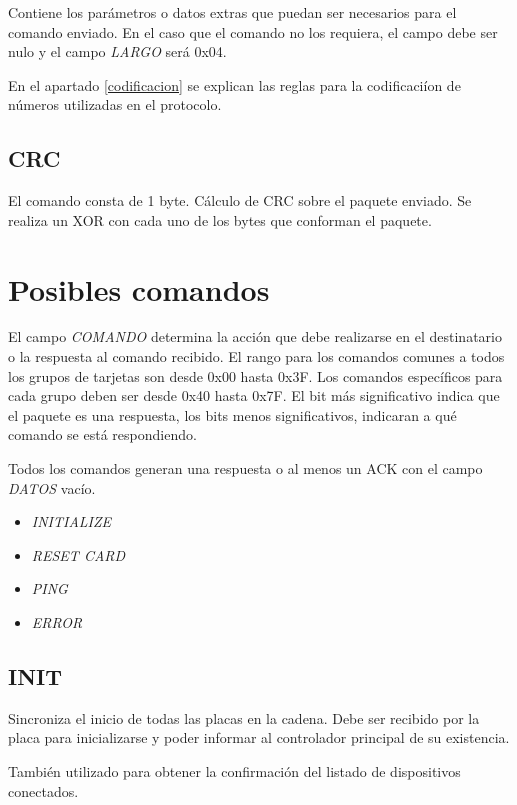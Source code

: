 \documentclass[a4paper,10pt]{article}
\begin{document}
	Contiene los par\'ametros o datos extras que puedan ser necesarios para el comando enviado.
	En el caso que el comando no los requiera, el campo debe ser nulo y el campo \emph{LARGO} ser\'a 0x04.

	En el apartado \ref{codificacion} se explican las reglas para la codificaci\'ion de n\'umeros utilizadas en el protocolo.

\subsection{CRC}
\label{crc}

	El comando consta de 1 byte.
	C\'alculo de CRC sobre el paquete enviado.
	Se realiza un XOR con cada uno de los bytes que conforman el paquete.

\section{Posibles comandos}
\label{comandos}

El campo \emph{COMANDO} determina la acci\'on que debe realizarse en el destinatario o la respuesta al comando recibido.
El rango para los comandos comunes a todos los grupos de tarjetas son desde 0x00 hasta 0x3F.
Los comandos espec\'ificos para cada grupo deben ser desde 0x40 hasta 0x7F.
El bit m\'as significativo indica que el paquete es una respuesta, los bits menos significativos, indicaran a qu\'e comando se est\'a respondiendo.

Todos los comandos generan una respuesta o al menos un ACK con el campo \emph{DATOS} vac\'io.

\begin{itemize}
	\item \emph{INITIALIZE}
	\item \emph{RESET CARD}
	\item \emph{PING}
	\item \emph{ERROR}
\label{lista_comandos}
\end{itemize}

\subsection{INIT}
\label{init}

Sincroniza el inicio de todas las placas en la cadena.
Debe ser recibido por la placa para inicializarse y poder informar al controlador principal de su existencia.

Tambi\'en utilizado para obtener la confirmaci\'on del listado de dispositivos conectados.
\end{document}
